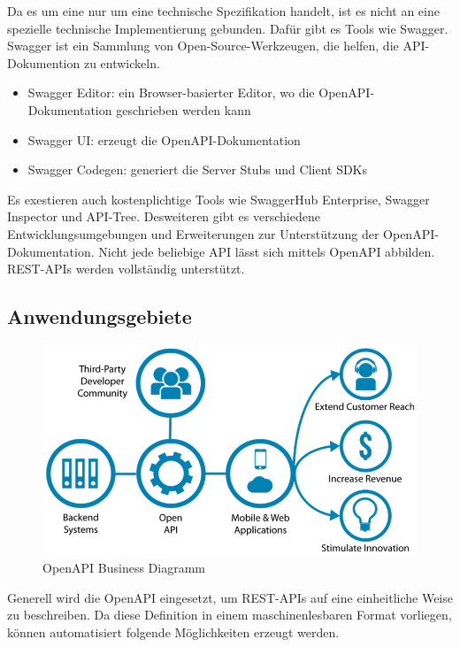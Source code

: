 Da es um eine nur um eine technische Spezifikation handelt, ist es nicht an eine spezielle technische Implementierung gebunden. Dafür gibt es Tools wie Swagger. 
Swagger ist ein Sammlung von Open-Source-Werkzeugen, die helfen, die API-Dokumention zu entwickeln. 
\begin{itemize}
    \item Swagger Editor: ein Browser-basierter Editor, wo die OpenAPI-Dokumentation geschrieben werden kann
    \item Swagger UI: erzeugt die OpenAPI-Dokumentation
    \item Swagger Codegen: generiert die Server Stubs und Client SDKs
\end{itemize}

Es exestieren auch kostenplichtige Tools wie SwaggerHub Enterprise, Swagger Inspector und API-Tree. 
Desweiteren gibt es verschiedene Entwicklungsumgebungen und Erweiterungen zur Unterstützung der OpenAPI-Dokumentation. 
Nicht jede beliebige API lässt sich mittels OpenAPI abbilden. REST-APIs werden vollständig unterstützt.

\subsection{Anwendungsgebiete}
\begin{figure}[h]
    \begin{center}
        \includegraphics*[width=14cm]{./pics/Open-APIs-v5.png}
        \caption[OpenAPI Business Diagramm]{OpenAPI Business Diagramm \cite{OpenAPIBusinessChart}}
    \end{center}
\end{figure}

Generell wird die OpenAPI eingesetzt, um REST-APIs auf eine einheitliche Weise zu beschreiben. Da diese Definition in einem 
maschinenlesbaren Format vorliegen, können automatisiert folgende Möglichkeiten erzeugt werden.

